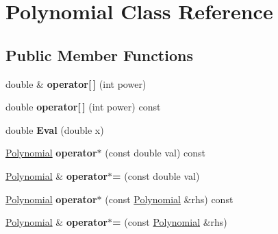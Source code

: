 \hypertarget{classPolynomial}{}\section{Polynomial Class Reference}
\label{classPolynomial}
\subsection*{Public Member Functions}
\begin{DoxyCompactItemize}
\item 
double \& {\bfseries operator\mbox{[}$\,$\mbox{]}} (int power)\hypertarget{classPolynomial_a8159721fa561bf68f6ad0c61e1ab28c4}{}\label{classPolynomial_a8159721fa561bf68f6ad0c61e1ab28c4}

\item 
double {\bfseries operator\mbox{[}$\,$\mbox{]}} (int power) const \hypertarget{classPolynomial_a4bd5fb1ace3d3ad09d9fbde9ede70cad}{}\label{classPolynomial_a4bd5fb1ace3d3ad09d9fbde9ede70cad}

\item 
double {\bfseries Eval} (double x)\hypertarget{classPolynomial_ae29c3326a10502032cdffcaccec7055f}{}\label{classPolynomial_ae29c3326a10502032cdffcaccec7055f}

\item 
\hyperlink{classPolynomial}{Polynomial} {\bfseries operator$\ast$} (const double val) const \hypertarget{classPolynomial_a72f47976238507e269fc3499ddb8fd37}{}\label{classPolynomial_a72f47976238507e269fc3499ddb8fd37}

\item 
\hyperlink{classPolynomial}{Polynomial} \& {\bfseries operator$\ast$=} (const double val)\hypertarget{classPolynomial_a168553118ab5269e1597f9b33d8d70a1}{}\label{classPolynomial_a168553118ab5269e1597f9b33d8d70a1}

\item 
\hyperlink{classPolynomial}{Polynomial} {\bfseries operator$\ast$} (const \hyperlink{classPolynomial}{Polynomial} \&rhs) const \hypertarget{classPolynomial_a1e00f25b4de1d335f437749c7bd93ac9}{}\label{classPolynomial_a1e00f25b4de1d335f437749c7bd93ac9}

\item 
\hyperlink{classPolynomial}{Polynomial} \& {\bfseries operator$\ast$=} (const \hyperlink{classPolynomial}{Polynomial} \&rhs)\hypertarget{classPolynomial_a2fe2da05d52f0c8866b9b55130e48f0e}{}\label{classPolynomial_a2fe2da05d52f0c8866b9b55130e48f0e}


\end{DoxyCompactItemize}
